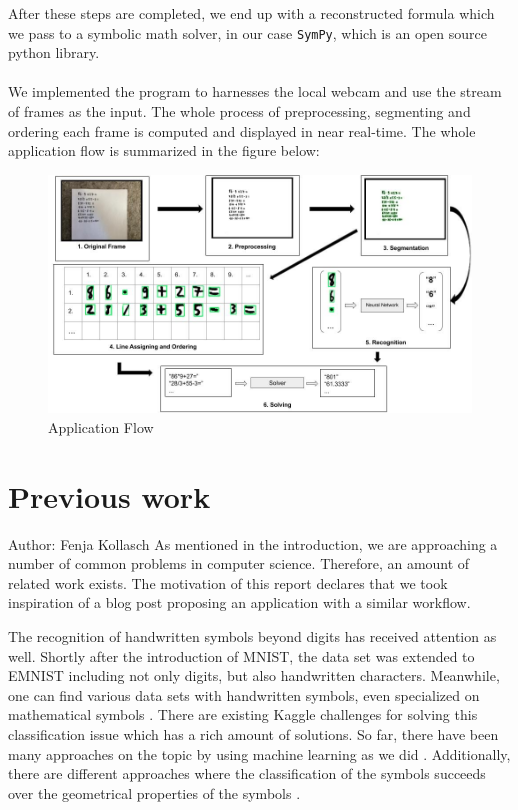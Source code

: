 \documentclass[11pt]{article}
\begin{document}
	After these steps are completed, we end up with a reconstructed formula which we pass to a symbolic math solver, in our case \texttt{SymPy}, which is an open source python library.\\\\
	We implemented the program to harnesses the local webcam and use the stream of frames as the input. The whole process of preprocessing, segmenting and ordering each frame is computed and displayed in near real-time.
	The whole application flow is summarized in the figure below:
	\begin{figure}[h]
		\includegraphics[width=1\textwidth]{ImagesForReport/fulldiagram.jpg}
		\caption{Application Flow}
		\label{fig:FullFlow}
	\end{figure}

	\pagebreak\section{Previous work}
	\small{Author: Fenja Kollasch} \newline \newline
	As mentioned in the introduction, we are approaching a number of common problems in computer science. Therefore, an amount of related work exists. The motivation of this report declares that we took inspiration of a blog post \cite{inspired-blog} proposing an application with a similar workflow. 
	
	The recognition of handwritten symbols beyond digits has received attention as well. Shortly after the introduction of MNIST, the data set was extended to EMNIST \cite{emnist} including not only digits, but also handwritten characters. Meanwhile, one can find various data sets with handwritten symbols, even specialized on mathematical symbols \cite{chajri2016}. There are existing Kaggle challenges for solving this classification issue \cite{kaggle} which has a rich amount of solutions. So far, there have been many approaches on the topic by using machine learning as we did \cite{ramadhan2016} \cite{lee2016}. Additionally, there are different approaches where the classification of the symbols succeeds over the geometrical properties of the symbols \cite{golubitsky2010}. 
	
\end{document}
